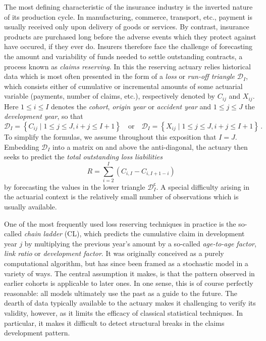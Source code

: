 \documentclass[a4paper]{book}
\begin{document}
The most defining characteristic of the insurance industry is the inverted nature of its production cycle. In manufacturing, commerce, transport, etc., payment is usually received only upon delivery of goods or services. By contrast, insurance products are purchased long before the adverse events which they protect against have occured, if they ever do. Insurers therefore face the challenge of forecasting the amount and variability of funds needed to settle outstanding contracts, a process known as \emph{claims reserving}. In this the reserving actuary relies historical data which is most often presented in the form of a \emph{loss} or \emph{run-off triangle} $\mathcal{D}_I$, which consists either of cumulative or incremental amounts of some actuarial variable (payments, number of claims, etc.), respectively denoted by $C_{ij}$ and $X_{ij}$. Here $1 \leq i \leq I$ denotes the \emph{cohort}, \emph{origin year} or \emph {accident year} and $1 \leq j \leq J$ the \emph{development year}, so that
\begin{equation}
    \mathcal{D}_I = \left  \{ C_{ij} \mid 1 \leq j \leq J, i + j \leq I + 1 \right \} 
    \quad \text{or} \quad 
    \mathcal{D}_I = \left  \{ X_{ij} \mid 1 \leq j \leq J, i + j \leq I + 1 \right \} \,.
\end{equation}
To simplify the formulas, we assume throughout this exposition that $I = J$. Embedding $\mathcal{D}_I$ into a matrix on and above the anti-diagonal, the actuary then seeks to predict the \emph{total outstanding loss liabilities}
\begin{equation}
    R = \sum_{i = 2}^I (C_{i, I} - C_{i, I + 1- i})
\end{equation}
by forecasting the values in the lower triangle $\mathcal{D}^{\mathsf{c}}_I$. A special difficulty arising in the actuarial context is the relatively small number of observations which is usually available.

One of the most frequently used loss reserving techniques in practice is the so-called \emph{chain ladder} (CL), which predicts the cumulative claim in development year $j$ by multiplying the previous year's amount by a so-called \emph{age-to-age factor}, \emph{link ratio} or \emph{development factor}. It was originally conceived as a purely computational algorithm, but has since been framed as a stochastic model in a variety of ways. The central assumption it makes, is that the pattern observed in earlier cohorts is applicable to later ones. In one sense, this is of course perfectly reasonable: all models ultimately use the past as a guide to the future. The dearth of data typically available to the actuary makes it challenging to verify its validity, however, as it limits the efficacy of classical statistical techniques. In particular, it makes it difficult to detect structural breaks in the claims development pattern. 
\end{document}

